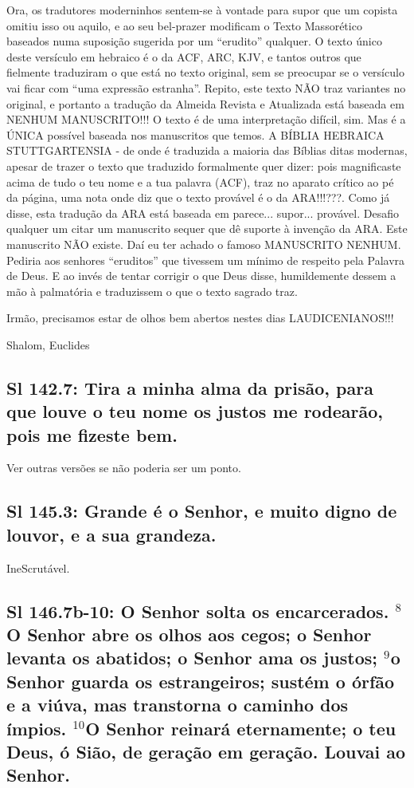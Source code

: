 Ora, os tradutores moderninhos sentem-se à vontade para supor que um copista omitiu isso ou aquilo, e ao seu bel-prazer modificam o Texto Massorético baseados numa suposição sugerida por um ``erudito'' qualquer. O texto único deste versículo em hebraico é o da ACF, ARC, KJV, e tantos outros que fielmente traduziram o que está no texto original, sem se preocupar se o versículo vai ficar com ``uma expressão estranha''. Repito, este texto NÃO traz variantes no original, e portanto a tradução da Almeida Revista e Atualizada está baseada em NENHUM MANUSCRITO!!! O texto é de uma interpretação difícil, sim. Mas é a ÚNICA possível baseada nos manuscritos que temos. A BÍBLIA HEBRAICA STUTTGARTENSIA - de onde é traduzida a maioria das Bíblias ditas modernas, apesar de trazer o texto que traduzido formalmente quer dizer: pois magnificaste acima de tudo o teu nome e a tua palavra (ACF), traz no aparato crítico ao pé da página, uma nota onde diz que o texto provável é o da ARA!!!???. Como já disse, esta tradução da ARA está baseada em parece... supor... provável. Desafio qualquer um citar um manuscrito sequer que dê suporte à invenção da ARA. Este manuscrito NÃO existe. Daí eu ter achado o famoso MANUSCRITO NENHUM. Pediria aos senhores ``eruditos'' que tivessem um mínimo de respeito pela Palavra de Deus. E ao invés de tentar corrigir o que Deus disse, humildemente dessem a mão à palmatória e traduzissem o que o texto sagrado traz.

Irmão, precisamos estar de olhos bem abertos nestes dias LAUDICENIANOS!!!

Shalom, Euclides

\subsection{Sl 142.7: Tira a minha alma da prisão, para que louve o teu nome\uwave{;} os justos me rodearão, pois me fizeste bem.}
Ver outras versões se não poderia ser um ponto.

\subsection{Sl 145.3: Grande é o Senhor, e muito digno de louvor, e a sua grandeza.}
IneScrutável.

\subsection{Sl 146.7b-10: O Senhor solta os encarcerados. $^{\mathrm{8}}$O Senhor abre os olhos aos cegos; o Senhor levanta os abatidos; o Senhor ama os justos; $^{\mathrm{9}}$o Senhor guarda os estrangeiros; sustém o órfão e a viúva, mas transtorna o caminho dos ímpios. $^{\mathrm{10}}$O Senhor reinará eternamente; o teu Deus, ó Sião, de geração em geração. Louvai ao Senhor.}

